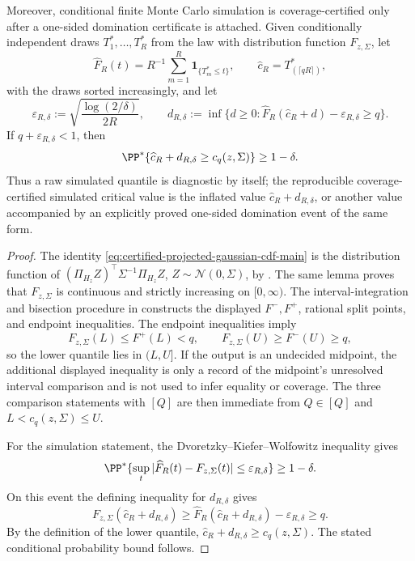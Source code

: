\begin{algorithmiclemma}
Moreover, conditional finite Monte Carlo simulation is coverage-certified only
after a one-sided domination certificate is attached.  Given conditionally
independent draws \(T_1^\ast,\ldots,T_R^\ast\) from the law with distribution
function \(F_{z,\Sigma}\), let
\[
\widehat F_R(t)=R^{-1}\sum_{m=1}^R\mathbf1_{\{T_m^\ast\le t\}},\qquad
\widehat c_R=T_{(\lceil qR\rceil)}^\ast ,
\]
with the draws sorted increasingly, and let
\[
\varepsilon_{R,\delta}:=\sqrt{\frac{\log(2/\delta)}{2R}},\qquad
d_{R,\delta}:=
\inf\{d\ge0:\widehat F_R(\widehat c_R+d)-\varepsilon_{R,\delta}\ge q\}.
\]
If \(q+\varepsilon_{R,\delta}<1\), then
\[
\PP^\ast\{\widehat c_R+d_{R,\delta}\ge c_q(z,\Sigma)\}\ge1-\delta .
\]
Thus a raw simulated quantile is diagnostic by itself; the reproducible
coverage-certified simulated critical value is the inflated value
\(\widehat c_R+d_{R,\delta}\), or another value accompanied by an explicitly proved
one-sided domination event of the same form.
\end{algorithmiclemma}

\begin{proof}
The identity \eqref{eq:certified-projected-gaussian-cdf-main} is the
distribution function of
\((\Pi_{H_z}Z)^\top\Sigma^{-1}\Pi_{H_z}Z\),
\(Z\sim\mathcal N(0,\Sigma)\), by
.  The
same lemma proves that \(F_{z,\Sigma}\) is continuous and strictly increasing
on \([0,\infty)\).  The interval-integration and bisection procedure in
 constructs
the displayed \(F^-,F^+\), rational split points, and endpoint inequalities.
The endpoint inequalities imply
\[
F_{z,\Sigma}(L)\le F^+(L)<q,\qquad
F_{z,\Sigma}(U)\ge F^-(U)\ge q,
\]
so the lower quantile lies in \((L,U]\).  If the output is an undecided
midpoint, the additional displayed inequality is only a record of the
midpoint's unresolved interval comparison and is not used to infer equality or
coverage.  The three comparison statements with \([Q]\) are then immediate
from \(Q\in[Q]\) and \(L<c_q(z,\Sigma)\le U\).

For the simulation statement, the Dvoretzky--Kiefer--Wolfowitz inequality gives
\[
\PP^\ast\{\sup_t|\widehat F_R(t)-F_{z,\Sigma}(t)|
\le\varepsilon_{R,\delta}\}\ge1-\delta .
\]
On this event the defining inequality for \(d_{R,\delta}\) gives
\[
F_{z,\Sigma}(\widehat c_R+d_{R,\delta})
\ge \widehat F_R(\widehat c_R+d_{R,\delta})-\varepsilon_{R,\delta}
\ge q .
\]
By the definition of the lower quantile,
\(\widehat c_R+d_{R,\delta}\ge c_q(z,\Sigma)\).  The stated conditional probability
bound follows.
\end{proof}


